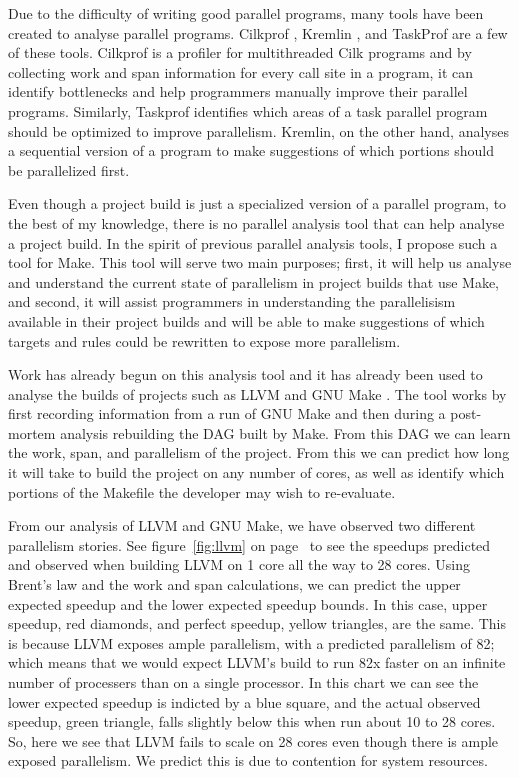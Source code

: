 \documentclass[10pt]{article}
\begin{document}
Due to the difficulty of writing good parallel programs, many tools have been created to analyse
parallel programs.  Cilkprof \cite{schardl2015cilkprof}, Kremlin \cite{garcia2011kremlin}, and
TaskProf \cite{yoga2017fast} are a few of these tools.  Cilkprof is a profiler for multithreaded
Cilk programs and by collecting work and span information for every call site in a program,
it can identify bottlenecks and help programmers manually improve their parallel programs.  Similarly,
Taskprof identifies which areas of a task parallel program should be optimized to improve
parallelism.  Kremlin, on the other hand, analyses a sequential version of a program to make
suggestions of which portions should be parallelized first.

Even though a project build is just a specialized version of a parallel program, to the best of
my knowledge, there is no parallel analysis tool that can help analyse a project build.  In the spirit of
previous parallel analysis tools, I propose such a tool for Make.  This tool will
serve two main purposes; first, it will help us analyse and understand the current state of
parallelism in project builds that use Make, and second, it will assist programmers in understanding
the parallelisism available in their project builds and will be able to make suggestions of which
targets and rules could be rewritten to expose more parallelism.

Work has already begun on this analysis tool and it has already been used to analyse the builds of
projects such as LLVM \cite{lattner2002llvm} and GNU Make \cite{gnumake}.  The tool works by first recording information from a
run of GNU Make and then during a post-mortem
analysis rebuilding the DAG built by Make.  From this DAG we can learn the work, span, and
parallelism of the project.  From this we can predict how long it will take to build
the project on any number of cores, as well as identify which portions of the Makefile the
developer may wish to re-evaluate.

From our analysis of LLVM and GNU Make, we have observed two different parallelism stories.
See figure~\ref{fig:llvm} on page~\pageref{fig:llvm} to see the speedups predicted and
observed when building LLVM on
1 core all the way to 28 cores.  Using Brent's law \cite{brent1974parallel} and the work and span
calculations, we can predict the upper expected speedup and the lower expected speedup bounds.
In this case, upper speedup, red diamonds, and perfect speedup, yellow triangles, are the same.
This is because LLVM exposes ample parallelism, with a predicted parallelism of 82; which means that
we would expect LLVM's build to run 82x faster on an infinite number of processers than on a single
processor.  In this chart we can see the lower expected speedup is indicted by a blue square, and
the actual observed speedup, green triangle, falls slightly below this when run about 10 to 28
cores.  So, here we see that LLVM fails to scale on 28 cores even though there is ample exposed
parallelism.  We predict this is due to contention for system resources.
\end{document}
